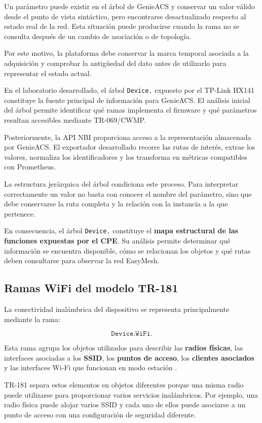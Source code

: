 Un parámetro puede existir en el árbol de GenieACS y conservar un valor
válido desde el punto de vista sintáctico, pero encontrarse
desactualizado respecto al estado real de la red. Esta situación puede
producirse cuando la rama no se consulta después de un cambio de
asociación o de topología.

Por este motivo, la plataforma debe conservar la marca temporal asociada
a la adquisición y comprobar la antigüedad del dato antes de utilizarlo
para representar el estado actual.

En el laboratorio desarrollado, el árbol \texttt{Device.} expuesto por
el TP-Link HX141 constituye la fuente principal de información para
GenieACS. El análisis inicial del árbol permite identificar qué ramas
implementa el firmware y qué parámetros resultan accesibles mediante
TR-069/CWMP.

Posteriormente, la API NBI proporciona acceso a la representación
almacenada por GenieACS. El exportador desarrollado recorre las rutas de
interés, extrae los valores, normaliza los identificadores y los
transforma en métricas compatibles con Prometheus.

La estructura jerárquica del árbol condiciona este proceso. Para
interpretar correctamente un valor no basta con conocer el nombre del
parámetro, sino que debe conservarse la ruta completa y la relación con
la instancia a la que pertenece.

En consecuencia, el árbol \texttt{Device.} constituye el
\textbf{mapa estructural de las funciones expuestas por el CPE}. Su
análisis permite determinar qué información se encuentra disponible, cómo
se relacionan los objetos y qué rutas deben consultarse para observar la
red EasyMesh.

\subsection{Ramas WiFi del modelo TR-181}
\label{subsec:ramas-wifi-modelo-tr181}

La conectividad inalámbrica del dispositivo se representa principalmente
mediante la rama:

\[
    \texttt{Device.WiFi.}
\]

Esta rama agrupa los objetos utilizados para describir las
\textbf{radios físicas}, las interfaces asociadas a los
\textbf{SSID}, los \textbf{puntos de acceso}, los
\textbf{clientes asociados} y las interfaces Wi-Fi que funcionan en modo
estación \cite{bbf_tr181}.

TR-181 separa estos elementos en objetos diferentes porque una misma
radio puede utilizarse para proporcionar varios servicios inalámbricos.
Por ejemplo, una radio física puede alojar varios SSID y cada uno de
ellos puede asociarse a un punto de acceso con una configuración de
seguridad diferente.

